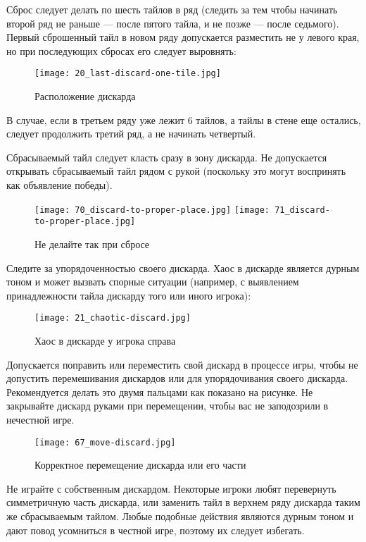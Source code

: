 Сброс следует делать по шесть тайлов в ряд (следить за тем чтобы начинать второй ряд не раньше --- после пятого тайла, и не позже --- после седьмого). Первый сброшенный тайл в новом ряду допускается разместить не у левого края, но при последующих сбросах его следует выровнять:

\begin{figure}[H]
	\centering
	\texttt{[image: 20\_last-discard-one-tile.jpg]}
	\caption{Расположение дискарда}
\end{figure}

В случае, если в третьем ряду уже лежит 6 тайлов, а тайлы в стене еще остались, следует продолжить третий ряд, а не начинать четвертый.

Сбрасываемый тайл следует класть сразу в зону дискарда. Не допускается открывать сбрасываемый тайл рядом с рукой (поскольку это могут воспринять как объявление победы).

\begin{figure}[H]
	\centering
	\texttt{[image: 70\_discard-to-proper-place.jpg]}
	\texttt{[image: 71\_discard-to-proper-place.jpg]}
	\caption{Не делайте так при сбросе}
\end{figure}

Следите за упорядоченностью своего дискарда. Хаос в дискарде является дурным тоном и может вызвать спорные ситуации (например, с выявлением принадлежности тайла дискарду того или иного игрока):

\begin{figure}[H]
	\centering
	\texttt{[image: 21\_chaotic-discard.jpg]}
	\caption{Хаос в дискарде у игрока справа}
\end{figure}

Допускается поправить или переместить свой дискард в процессе игры, чтобы не допустить перемешивания дискардов или для упорядочивания своего дискарда. Рекомендуется делать это двумя пальцами как показано на рисунке. Не закрывайте дискард руками при перемещении, чтобы вас не заподозрили в нечестной игре.

\begin{figure}[H]
	\centering
	\texttt{[image: 67\_move-discard.jpg]}
	\caption{Корректное перемещение дискарда или его части}
\end{figure}

Не играйте с собственным дискардом. Некоторые игроки любят перевернуть симметричную часть дискарда, или заменить тайл в верхнем ряду дискарда таким же сбрасываемым тайлом. Любые подобные действия являются дурным тоном и дают повод усомниться в честной игре, поэтому их следует избегать.

